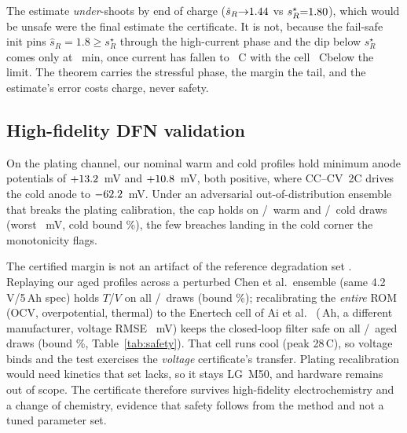 \documentclass[conference]{IEEEtran}
\newcommand{\degC}{\textdegree C}
\newcommand{\SI}[2]{#1\,#2}
\newcommand{\degreeCelsius}{\textdegree C}
\begin{document}
The estimate \emph{under}-shoots by end of charge ($\hat s_R{\to}1.44$ vs
$s_R^\star{=}1.80$), which would be unsafe were the final estimate the certificate. It is
not, because the fail-safe init pins $\hat s_R{=}1.8\ge s_R^\star$ through the high-current phase and
the dip below $s_R^\star$ comes only at \precondDipMin~min, once current has fallen to \precondDipI~C
with the cell \precondDipHead~\degC below the limit. The theorem carries the stressful phase, the
margin the tail, and the estimate's error costs charge, never safety.

\subsection{High-fidelity DFN validation}
\label{sec:dfn}
On the plating channel, our nominal warm and cold profiles hold minimum anode potentials of
$+13.2$~mV and $+10.8$~mV, both positive, where CC--CV~2C drives the cold
anode to $-62.2$~mV. Under an adversarial out-of-distribution ensemble that breaks the plating calibration, the cap holds
on \oodWarmSafe/\oodWarmN\ warm and \oodColdSafe/\oodColdN\ cold draws (worst \oodWorst~mV, cold
bound \oodColdCP\%), the few breaches landing in the cold corner the monotonicity flags.

The certified margin is not an artifact of the reference degradation set \cite{okane2022}. Replaying our aged profiles across a perturbed
Chen et al.\ ensemble (same \SI{4.2}{V}/\SI{5}{Ah} spec) holds $T$/$V$ on all
\crossEnsSafe/\crossEnsN\ draws (bound \crossEnsCP\%); recalibrating the \emph{entire} ROM (OCV,
overpotential, thermal) to the Enertech cell of Ai et al.\ \cite{ai2020} (\SI{\chemTwoQ}{Ah}, a different manufacturer,
voltage RMSE \chemTwoV~mV) keeps the closed-loop filter safe on all \chemTwoSafe/\chemTwoN\ aged draws
(bound \chemTwoCP\%, Table~\ref{tab:safety}). That cell runs cool (peak \SI{28}{\degreeCelsius}), so
voltage binds and the test exercises the \emph{voltage} certificate's transfer. Plating recalibration
would need kinetics that set lacks, so it stays LG~M50, and hardware remains out of scope. The
certificate therefore survives high-fidelity electrochemistry and a change of chemistry, evidence that
safety follows from the method and not a tuned parameter set.
\end{document}
